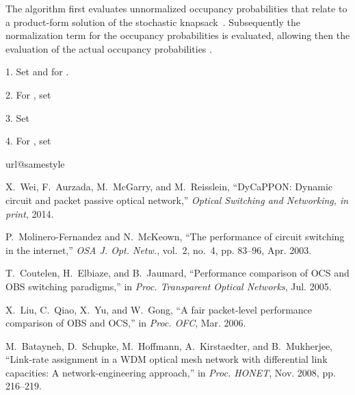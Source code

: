 \documentclass[article]{IEEEtran}
\begin{document}
The algorithm first evaluates unnormalized occupancy probabilities
 that relate to a product-form solution of the
stochastic knapsack~\cite{Ross95}. Subsequently the normalization
term  for the occupancy probabilities is evaluated, allowing then
the evaluation of the actual occupancy probabilities .

1. Set  and  for .

2. For , set


3. Set


4. For , set




\begin{thebibliography}{100}
\providecommand{\url}[1]{#1}
\csname url@samestyle\endcsname
\providecommand{\newblock}{\relax}
\providecommand{\bibinfo}[2]{#2}
\providecommand{\BIBentrySTDinterwordspacing}{\spaceskip=0pt\relax}
\providecommand{\BIBentryALTinterwordstretchfactor}{4}
\providecommand{\BIBentryALTinterwordspacing}{\spaceskip=\fontdimen2\font plus
\BIBentryALTinterwordstretchfactor\fontdimen3\font minus
  \fontdimen4\font\relax}
\providecommand{\BIBforeignlanguage}[2]{{\expandafter\ifx\csname l@#1\endcsname\relax
\typeout{** WARNING: IEEEtran.bst: No hyphenation pattern has been}\typeout{** loaded for the language `#1'. Using the pattern for}\typeout{** the default language instead.}\else
\language=\csname l@#1\endcsname
\fi
#2}}
\providecommand{\BIBdecl}{\relax}
\BIBdecl

X.~Wei, F.~Aurzada, M.~McGarry, and M.~Reisslein, ``{DyCaPPON}: Dynamic circuit
  and packet passive optical network,'' \emph{Optical Switching and Networking,
  in print}, 2014.

P.~Molinero-Fernandez and N.~McKeown, ``The performance of circuit switching in
  the internet,'' \emph{OSA J. Opt. Netw.}, vol.~2, no.~4, pp. 83--96, Apr.
  2003.

T.~Coutelen, H.~Elbiaze, and B.~Jaumard, ``Performance comparison of {OCS} and
  {OBS} switching paradigms,'' in \emph{Proc. Transparent Optical Networks},
  Jul. 2005.

X.~Liu, C.~Qiao, X.~Yu, and W.~Gong, ``A fair packet-level performance
  comparison of {OBS} and {OCS},'' in \emph{Proc. OFC}, Mar. 2006.

M.~Batayneh, D.~Schupke, M.~Hoffmann, A.~Kirstaedter, and B.~Mukherjee,
  ``Link-rate assignment in a {WDM} optical mesh network with differential link
  capacities: A network-engineering approach,'' in \emph{Proc. HONET}, Nov.
  2008, pp. 216--219.


\end{thebibliography}
\end{document}
